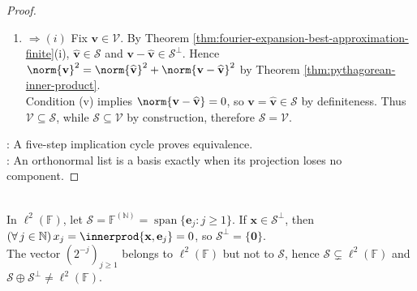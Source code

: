 \begin{theorem}
\begin{proof}
\begin{enumerate}[label=(\roman*)]
\item[$(v)$]$\Rightarrow (i)$ Fix $\mathbf{v}\in\mathcal{V}$. By Theorem \ref{thm:fourier-expansion-best-approximation-finite}(i), $\widehat{\mathbf{v}}\in\mathcal{S}$ and $\mathbf{v}-\widehat{\mathbf{v}}\in\mathcal{S}^{\perp}$. Hence $\norm{\mathbf{v}}^2=\norm{\widehat{\mathbf{v}}}^2+\norm{\mathbf{v}-\widehat{\mathbf{v}}}^2$ by Theorem \ref{thm:pythagorean-inner-product}.\\
Condition (v) implies $\norm{\mathbf{v}-\widehat{\mathbf{v}}}=0$, so $\mathbf{v}=\widehat{\mathbf{v}}\in\mathcal{S}$ by definiteness. Thus $\mathcal{V}\subseteq\mathcal{S}$, while $\mathcal{S}\subseteq\mathcal{V}$ by construction,  therefore $\mathcal{S}=\mathcal{V}$.
\end{enumerate}
: A five-step implication cycle proves equivalence.\\
: An orthonormal list is a basis exactly when its projection loses no component.
\end{proof}
\end{theorem}

\begin{perspective} \label{per:projection-theorem-finite-dimensional-hypothesis} \\
In $\ell^2(\mathbb{F})$, let $\mathcal{S}=\mathbb{F}^{(\mathbb{N})}=\operatorname{span}\{\mathbf{e}_j:j\geq1\}$. If $\mathbf{x}\in\mathcal{S}^{\perp}$, then $(\forall\,j\in\mathbb{N})\,x_j=\innerprod{\mathbf{x},\mathbf{e}_j}=0$, so $\mathcal{S}^{\perp}=\{\mathbf{0}\}$.\\
The vector $(2^{-j})_{j\geq1}$ belongs to $\ell^2(\mathbb{F})$ but not to $\mathcal{S}$, hence $\mathcal{S}\subsetneq\ell^2(\mathbb{F})$ and $\mathcal{S}\oplus\mathcal{S}^{\perp}\neq\ell^2(\mathbb{F})$.
\end{perspective}
